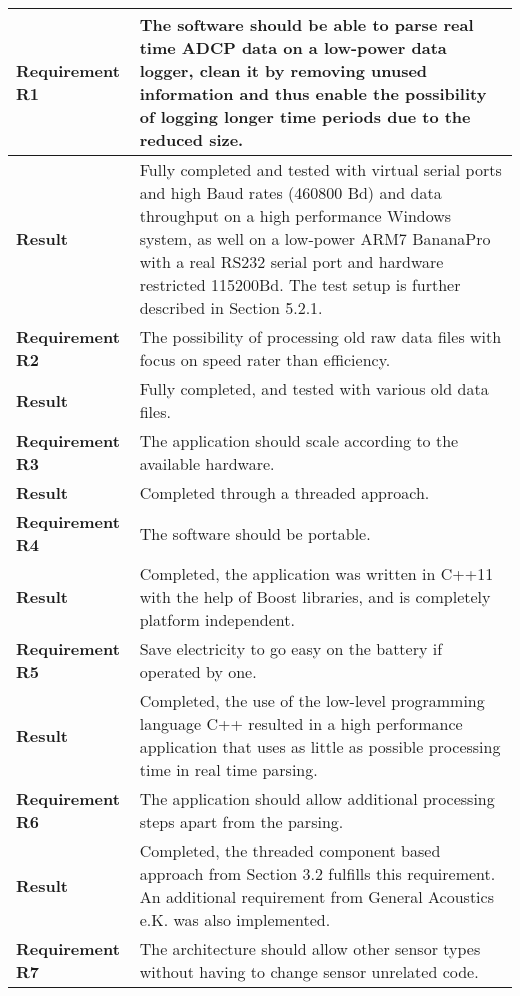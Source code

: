 \begin{tabular}{|l|l|}
  \hline
  	\textbf{Requirement R1} & The software should be able to parse real time ADCP data on a low-power data logger, clean it by removing unused information and thus enable the possibility of logging longer time periods due to the reduced size.\\ \hline
  	\textbf{Result} & Fully completed and tested with virtual serial ports and high Baud rates (460800 Bd) and data throughput on a high performance Windows system, as well on a low-power ARM7 BananaPro with a real RS232 serial port and hardware restricted 115200Bd. The test setup is further described in Section 5.2.1.\\
  \hline
  \hline
  	\textbf{Requirement R2} & The possibility of processing old raw data files with focus on speed rater than efficiency.\\ \hline
  	\textbf{Result} & Fully completed, and tested with various old data files.\\
  \hline
  \hline
  	\textbf{Requirement R3} & The application should scale according to the available hardware.\\ \hline
  	\textbf{Result} & Completed through a threaded approach.\\
  \hline
  \hline
  	\textbf{Requirement R4} & The software should be portable. \\ \hline
  	\textbf{Result} & Completed, the application was written in C++11 with the help of Boost libraries, and is completely platform independent.\\
  \hline
  \hline
  	\textbf{Requirement R5} & Save electricity to go easy on the battery if operated by one.\\ \hline
  	\textbf{Result} & Completed, the use of the low-level programming language C++ resulted in a high performance application that uses as little as possible processing time in real time parsing. \\
  \hline
  \hline
  	\textbf{Requirement R6} & The application should allow additional processing steps apart from the parsing.\\ \hline
  	\textbf{Result} & Completed, the threaded component based approach from Section 3.2 fulfills this requirement. An additional requirement from General Acoustics e.K. was also implemented.\\
  \hline
  \hline
  	\textbf{Requirement R7} & The architecture should allow other sensor types without having to change sensor unrelated code.\\ \hline

\end{tabular}
